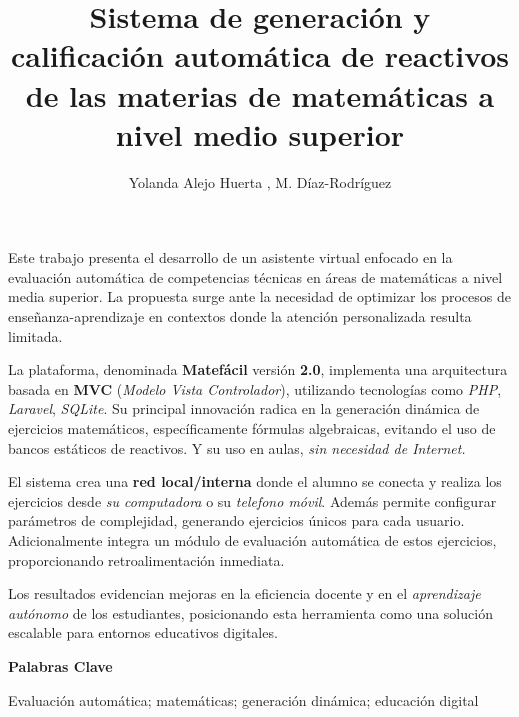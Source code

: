 \documentclass[25pt, a0paper, portrait]{tsj-poster}
\title{Sistema de generación y calificación automática de reactivos
de las materias de matemáticas a nivel medio superior}
\author{Yolanda Alejo Huerta , M. Díaz-Rodríguez}
\institute{Tecnológico Superior de Jalisco, Unidad Académica Zapopan,
za240113432@zapopan.tecmm.edu.mx,
miriam.diaz@zapopan.tecmm.edu.mx
}
\begin{document}
\maketitle

{
Este trabajo presenta el desarrollo de un asistente virtual enfocado
en la evaluación automática de competencias técnicas en áreas de
matemáticas a nivel media superior. La propuesta surge ante la
necesidad de optimizar los procesos de enseñanza-aprendizaje en
contextos donde la atención personalizada resulta limitada.
\vspace{1em}

La plataforma, denominada \textbf{Matefácil} versión \textbf{2.0},
implementa una arquitectura basada en \textbf{MVC}
(\emph{Modelo Vista Controlador}), utilizando
tecnologías como \emph{PHP}, \emph{Laravel}, \emph{SQLite}.
Su principal innovación radica en la generación
dinámica de ejercicios matemáticos, específicamente fórmulas
algebraicas, evitando el uso de bancos estáticos de reactivos.
Y su uso en aulas, \emph{sin necesidad de Internet.}
\vspace{1em}

El sistema crea una \textbf{red local/interna} donde el alumno se conecta y
realiza los ejercicios desde \emph{su computadora} o su \emph{telefono móvil}.
Además permite configurar parámetros de complejidad, generando
ejercicios únicos para cada usuario. Adicionalmente integra un módulo de
evaluación automática de estos ejercicios, proporcionando
retroalimentación inmediata.
\vspace{1em}

Los resultados evidencian mejoras en la eficiencia docente y en el
\emph{aprendizaje autónomo} de los estudiantes, posicionando esta
herramienta como una solución escalable para entornos educativos digitales.

\vspace{2em}
{
\color{titlefgcolor}
\bfseries \Large Palabras Clave \par
}
Evaluación automática; matemáticas; generación dinámica; educación digital
}
\end{document}

